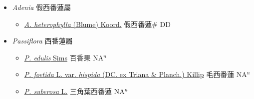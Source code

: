 
  \begin{itemize}
 \item[] \textit{Adenia} 假西番蓮屬
                    
  \begin{itemize}
        \item[] \href{http://www.theplantlist.org/tpl1.1/search?q=Adenia+heterophylla}{\textit{A. heterophylla} (Blume) Koord.}     假西番蓮\# DD
  \end{itemize}
 \item[] \textit{Passiflora} 西番蓮屬
                    
  \begin{itemize}
        \item[] \href{http://www.theplantlist.org/tpl1.1/search?q=Passiflora+edulis}{\textit{P. edulis} Sims}   百香果 NA$^n$
        \item[] \href{http://www.theplantlist.org/tpl1.1/search?q=Passiflora+foetida+var.+hispida}{\textit{P. foetida} L. var. \textit{hispida} (DC. ex Triana \& Planch.) Killip}   毛西番蓮 NA$^n$
        \item[] \href{http://www.theplantlist.org/tpl1.1/search?q=Passiflora+suberosa}{\textit{P. suberosa} L.}   三角葉西番蓮 NA$^n$
  \end{itemize}
  \end{itemize}
